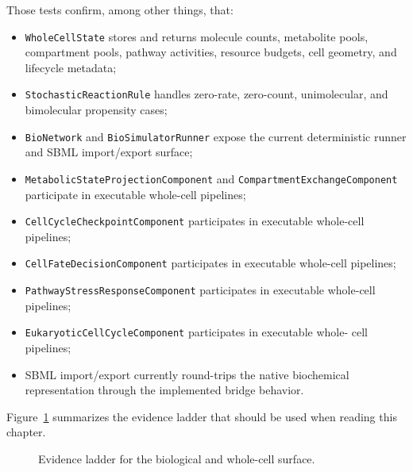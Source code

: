 Those tests confirm, among other things, that:
\begin{itemize}
\item \texttt{WholeCellState} stores and returns molecule counts, metabolite
      pools, compartment pools, pathway activities, resource budgets, cell
      geometry, and lifecycle metadata;
\item \texttt{StochasticReactionRule} handles zero-rate, zero-count, unimolecular,
      and bimolecular propensity cases;
\item \texttt{BioNetwork} and \texttt{BioSimulatorRunner} expose the current
      deterministic runner and SBML import/export surface;
\item \texttt{MetabolicStateProjectionComponent} and
      \texttt{CompartmentExchangeComponent} participate in executable
      whole-cell pipelines;
\item \texttt{CellCycleCheckpointComponent} participates in executable
      whole-cell pipelines;
\item \texttt{CellFateDecisionComponent} participates in executable whole-cell
      pipelines;
\item \texttt{PathwayStressResponseComponent} participates in executable
      whole-cell pipelines;
\item \texttt{EukaryoticCellCycleComponent} participates in executable whole-
      cell pipelines;
\item SBML import/export currently round-trips the native biochemical
      representation through the implemented bridge behavior.
\end{itemize}

Figure~\ref{fig:evidence-ladder} summarizes the evidence ladder that should be
used when reading this chapter.

\begin{figure}[htbp]
\centering
\caption{Evidence ladder for the biological and whole-cell surface.}
\label{fig:evidence-ladder}
\end{figure}

